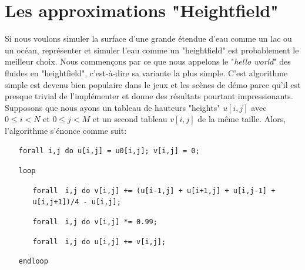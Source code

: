 \documentclass[11pt]{report}
\begin{document}
\chapter{Les approximations "Heightfield"} \label{chap:heightfield-approx}

Si nous voulons simuler la surface d'une grande étendue d'eau comme un lac ou un océan, représenter et simuler l'eau comme un "heightfield" est probablement le meilleur choix. Nous commençons par ce que nous appelons le "\textit{hello world}" des fluides en "heightfield", c'est-à-dire sa variante la plus simple. C'est algorithme simple est devenu bien populaire dans le jeux et les scènes de démo parce qu'il est presque trivial de l'implémenter et donne des résultats pourtant impressionants. Supposons que nous ayons un tableau de hauteurs "heights" $u[i,j]$ avec $0 \leq i < N$ et $0 \leq j < M$ et un second tableau $v[i,j]$ de la même taille. Alors, l'algorithme s'énonce comme suit:\newline

\begin{itemize}

\item[\texttt{forall i,j do u[i,j] = u0[i,j]; v[i,j] = 0;}]

\item[\texttt{loop}]

	\begin{itemize}
		\item[ ]
		\item[\texttt{forall}]\texttt{ i,j do v[i,j] += (u[i-1,j] + u[i+1,j] + u[i,j-1] + u[i,j+1])/4 - u[i,j];}
	
		\item[\texttt{forall}]\texttt{ i,j do v[i,j] *= 0.99;}
	
		\item[\texttt{forall}]\texttt{ i,j do u[i,j] += v[i,j];}
	
	\end{itemize}

\item[\texttt{endloop}]

\end{itemize} 
\vspace{2em}
\end{document}
